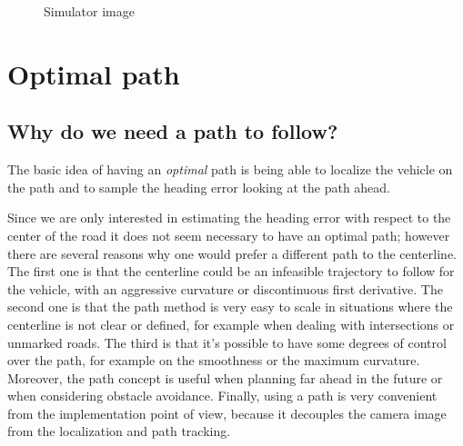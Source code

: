 \documentclass[a4paper,12pt,sort&compress]{article}
\begin{document}
    \begin{figure}
        \centering
        \caption{ Simulator image }
        \label{fig:simulator}
    \end{figure}

\clearpage

\section{Optimal path}

    \subsection{Why do we need a path to follow?}
    The basic idea of having an \textit{optimal} path is being able to localize the vehicle on the
    path and to sample the heading error looking at the path ahead. 

    Since we are only interested in estimating the heading error with respect to the center of the
    road it does not seem necessary to have an optimal path; however there are several reasons
    why one would prefer a different path to the centerline. The first one is that the centerline
    could be an infeasible trajectory to follow for the vehicle, with an aggressive curvature or
    discontinuous first derivative. The second one is that the path
    method is very easy to scale in situations where the centerline is not clear or defined, for
    example when dealing with intersections or unmarked roads. The third is that it's possible to
    have some degrees of control over the path, for example on the smoothness or the maximum
    curvature. Moreover, the path concept is useful when planning far ahead in the future or when
    considering obstacle avoidance. Finally, using a path is very convenient from the implementation point of
    view, because it decouples the camera image from the localization and path tracking.
\end{document}
